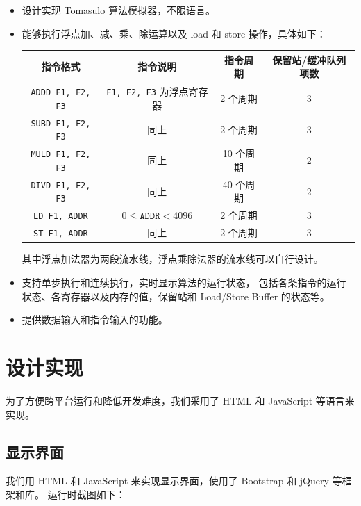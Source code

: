 \documentclass[11pt, a4paper]{article}
\begin{document}
\begin{itemize}
  \item 设计实现 Tomasulo 算法模拟器，不限语言。
  \item {
    能够执行浮点加、减、乘、除运算以及 load 和 store 操作，具体如下：
    
    \begin{tabular}{|c|c|c|c|}
      \hline
      指令格式 & 指令说明 & 指令周期 & 保留站/缓冲队列项数 \\ \hline
      \texttt{ADDD F1, F2, F3} & \texttt{F1, F2, F3} 为浮点寄存器 & 2 个周期 & 3 \\ \hline
      \texttt{SUBD F1, F2, F3} & 同上 & 2 个周期 & 3 \\ \hline
      \texttt{MULD F1, F2, F3} & 同上 & 10 个周期 & 2 \\ \hline
      \texttt{DIVD F1, F2, F3} & 同上 & 40 个周期 & 2 \\ \hline
      \texttt{LD F1, ADDR} & $0 \le \texttt{ADDR} < 4096$ & 2 个周期 & 3 \\ \hline
      \texttt{ST F1, ADDR} & 同上 & 2 个周期 & 3 \\ \hline
    \end{tabular}
    
    其中浮点加法器为两段流水线，浮点乘除法器的流水线可以自行设计。
  }
  \item {
    支持单步执行和连续执行，实时显示算法的运行状态，
    包括各条指令的运行状态、各寄存器以及内存的值，保留站和 Load/Store Buffer 的状态等。
  }
  \item {
    提供数据输入和指令输入的功能。
  }
\end{itemize}


\section{设计实现}

为了方便跨平台运行和降低开发难度，我们采用了 HTML 和 JavaScript 等语言来实现。

\subsection{显示界面}

我们用 HTML 和 JavaScript 来实现显示界面，使用了 Bootstrap 和 jQuery 等框架和库。
运行时截图如下：
\end{document}
